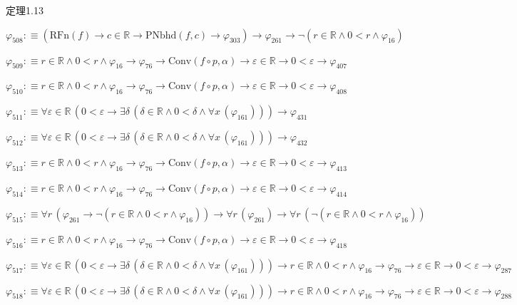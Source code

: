 \begin{fullproof}{定理1.13}
\begin{abbrevlist}
\item $\varphi_{508} :\equiv (\mathrm{RFn}(f) \to c \in \mathbb{R} \to \mathrm{PNbhd}(f,c) \to \varphi_{303}) \to \varphi_{261} \to \neg (r \in \mathbb{R} \land 0 < r \land \varphi_{16})$
\item $\varphi_{509} :\equiv r \in \mathbb{R} \land 0 < r \land \varphi_{16} \to \varphi_{76} \to \mathrm{Conv}(f \circ p,\alpha) \to \varepsilon \in \mathbb{R} \to 0 < \varepsilon \to \varphi_{407}$
\item $\varphi_{510} :\equiv r \in \mathbb{R} \land 0 < r \land \varphi_{16} \to \varphi_{76} \to \mathrm{Conv}(f \circ p,\alpha) \to \varepsilon \in \mathbb{R} \to 0 < \varepsilon \to \varphi_{408}$
\item $\varphi_{511} :\equiv \forall \varepsilon \in \mathbb{R}\,(0 < \varepsilon \to \exists \delta\,(\delta \in \mathbb{R} \land 0 < \delta \land \forall x\,(\varphi_{161}))) \to \varphi_{431}$
\item $\varphi_{512} :\equiv \forall \varepsilon \in \mathbb{R}\,(0 < \varepsilon \to \exists \delta\,(\delta \in \mathbb{R} \land 0 < \delta \land \forall x\,(\varphi_{161}))) \to \varphi_{432}$
\item $\varphi_{513} :\equiv r \in \mathbb{R} \land 0 < r \land \varphi_{16} \to \varphi_{76} \to \mathrm{Conv}(f \circ p,\alpha) \to \varepsilon \in \mathbb{R} \to 0 < \varepsilon \to \varphi_{413}$
\item $\varphi_{514} :\equiv r \in \mathbb{R} \land 0 < r \land \varphi_{16} \to \varphi_{76} \to \mathrm{Conv}(f \circ p,\alpha) \to \varepsilon \in \mathbb{R} \to 0 < \varepsilon \to \varphi_{414}$
\item $\varphi_{515} :\equiv \forall r\,(\varphi_{261} \to \neg (r \in \mathbb{R} \land 0 < r \land \varphi_{16})) \to \forall r\,(\varphi_{261}) \to \forall r\,(\neg (r \in \mathbb{R} \land 0 < r \land \varphi_{16}))$
\item $\varphi_{516} :\equiv r \in \mathbb{R} \land 0 < r \land \varphi_{16} \to \varphi_{76} \to \mathrm{Conv}(f \circ p,\alpha) \to \varepsilon \in \mathbb{R} \to 0 < \varepsilon \to \varphi_{418}$
\item $\varphi_{517} :\equiv \forall \varepsilon \in \mathbb{R}\,(0 < \varepsilon \to \exists \delta\,(\delta \in \mathbb{R} \land 0 < \delta \land \forall x\,(\varphi_{161}))) \to r \in \mathbb{R} \land 0 < r \land \varphi_{16} \to \varphi_{76} \to \varepsilon \in \mathbb{R} \to 0 < \varepsilon \to \varphi_{287}$
\item $\varphi_{518} :\equiv \forall \varepsilon \in \mathbb{R}\,(0 < \varepsilon \to \exists \delta\,(\delta \in \mathbb{R} \land 0 < \delta \land \forall x\,(\varphi_{161}))) \to r \in \mathbb{R} \land 0 < r \land \varphi_{16} \to \varphi_{76} \to \varepsilon \in \mathbb{R} \to 0 < \varepsilon \to \varphi_{288}$

\end{abbrevlist}
\end{fullproof}
